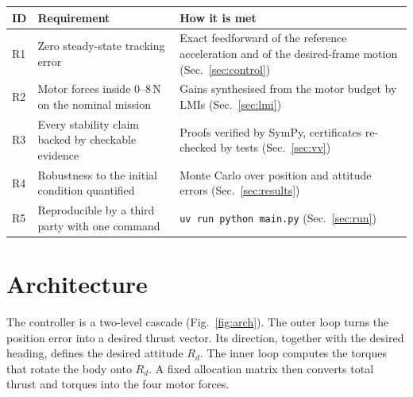 \documentclass[10pt,a4paper]{scrartcl}
\newcommand{\RuleSection}[1]{%
    \section{#1}%
    \vspace{0.2em}{\color{accent!35}\hrule height 0.4pt}\vspace{0.3em}%
  }
\begin{document}
  \begin{table}[h]
  \small
  \centering
  \renewcommand{\arraystretch}{1.1}
  \begin{tabularx}{\textwidth}{@{}L{0.7cm} L{6.3cm} X@{}}
  \toprule
  \textbf{ID} & \textbf{Requirement} & \textbf{How it is met} \\[.15cm]
  \midrule
  R1 & Zero steady-state tracking error & Exact feedforward of the reference acceleration and of the desired-frame motion (Sec.~\ref{sec:control}) \\[.15cm]
  R2 & Motor forces inside 0--8\,N on the nominal mission & Gains synthesised from the motor budget by LMIs (Sec.~\ref{sec:lmi}) \\[.15cm]
  R3 & Every stability claim backed by checkable evidence & Proofs verified by SymPy, certificates re-checked by tests (Sec.~\ref{sec:vv}) \\[.15cm]
  R4 & Robustness to the initial condition quantified & Monte Carlo over position and attitude errors (Sec.~\ref{sec:results}) \\[.15cm]
  R5 & Reproducible by a third party with one command & \texttt{uv run python main.py} (Sec.~\ref{sec:run}) \\[.15cm]
  \bottomrule
  \end{tabularx}
  \end{table}

  \RuleSection{Architecture}
  \label{sec:arch}

  The controller is a two-level cascade (Fig.~\ref{fig:arch}). The outer loop turns the position
  error into a desired thrust vector. Its direction, together with the desired heading, defines
  the desired attitude $R_d$. The inner loop computes the torques that rotate the body onto
  $R_d$. A fixed allocation matrix then converts total thrust and torques into the four motor
  forces.
\end{document}
